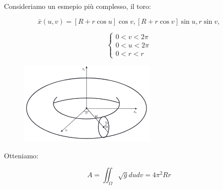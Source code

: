 \begin{exampleblock}[Toro]
    Consideriamo un esmepio più complesso, il toro:

    $$
    \bar x (u, v) = [R + r \cos u] \cos v, [R + r \cos v] \sin u, r \sin v,
    $$
    
    \begin{minipage}[H]{0.5\textwidth}
        $$
        \begin{cases}
            0 < v < 2\pi \\
            0 < u < 2\pi \\
            0 < r < r
        \end{cases}
        $$
    \end{minipage}%
    \begin{minipage}[H]{0.5\textwidth}
        \begin{figure}[H]
            \centering
            \includegraphics[width=0.6\textwidth]{assets/toro.png}
        \end{figure}
    \end{minipage}
    
    Otteniamo:

    $$
    A = \iint_{\Omega} \sqrt{g} du dv = \boxed{4 \pi^2 R r}
    $$

\end{exampleblock}